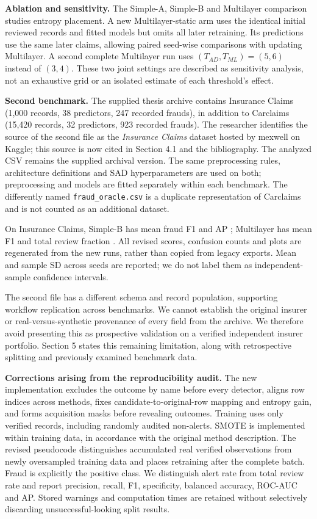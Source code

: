 \documentclass[11pt,a4paper]{article}
\begin{document}
\textbf{Ablation and sensitivity.} The Simple-A, Simple-B and Multilayer
comparison studies entropy placement. A new Multilayer-static arm uses the
identical initial reviewed records and fitted models but omits all later
retraining. Its predictions use the same later claims, allowing paired
seed-wise comparisons with updating Multilayer. A second complete
Multilayer run uses $(T_{AD},T_{ML})=(5,6)$ instead of $(3,4)$.
These two joint settings are described as sensitivity analysis, not an
exhaustive grid or an isolated estimate of each threshold's effect.

\textbf{Second benchmark.} The supplied thesis archive contains Insurance
Claims (1,000 records, 38 predictors, 247 recorded frauds), in addition to
Carclaims (15,420 records, 32 predictors, 923 recorded frauds).
The researcher identifies the source of the second file as the
\emph{Insurance Claims} dataset hosted by mexwell on Kaggle; this source
is now cited in Section 4.1 and the bibliography. The analyzed CSV remains
the supplied archival version. The same preprocessing rules, architecture
definitions and SAD hyperparameters are used on both; preprocessing and models are fitted
separately within each benchmark. The differently named
\texttt{fraud\_oracle.csv} is a duplicate representation of Carclaims and is
not counted as an additional dataset.

On Insurance Claims, Simple-B has mean fraud F1 \ExtSimpleBFone{} and AP
\ExtSimpleBAP{}; Multilayer has mean F1 \ExtMultiFone{} and total review
fraction \ExtMultiReview{}. All revised scores, confusion counts and plots
are regenerated from the new runs, rather than copied from legacy exports.
Mean and sample SD across seeds are reported; we do not label them as
independent-sample confidence intervals.

The second file has a different schema and record population, supporting
workflow replication across benchmarks. We cannot establish the original
insurer or real-versus-synthetic provenance of every field from the archive.
We therefore avoid presenting this as prospective validation on a verified
independent insurer portfolio. Section 5 states this remaining limitation,
along with retrospective splitting and previously examined benchmark data.

\textbf{Corrections arising from the reproducibility audit.} The new
implementation excludes the outcome by name before every detector, aligns
row indices across methods, fixes candidate-to-original-row mapping and
entropy gain, and forms acquisition masks before revealing outcomes.
Training uses only verified records, including randomly audited non-alerts.
SMOTE is implemented within training data, in accordance with the original
method description. The revised pseudocode distinguishes accumulated real
verified observations from newly oversampled training data and places
retraining after the complete batch. Fraud is explicitly
the positive class. We distinguish alert rate from total review rate and
report precision, recall, F1, specificity, balanced accuracy, ROC-AUC and AP.
Stored warnings and computation times are retained without selectively
discarding unsuccessful-looking split results.
\end{document}
